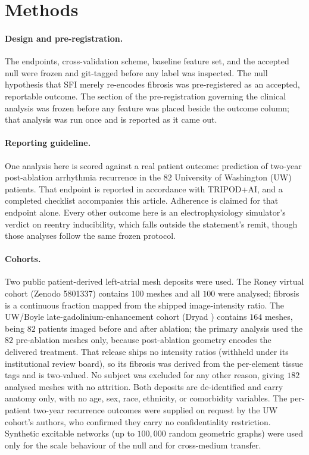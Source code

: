 ﻿\section{Methods}

\paragraph{Design and pre-registration.} The endpoints, cross-validation scheme,
baseline feature set, and the accepted null were frozen and git-tagged before any
label was inspected. The null hypothesis that SFI merely re-encodes fibrosis was
pre-registered as an accepted, reportable outcome. The section of the
pre-registration governing the clinical analysis was frozen before any feature was
placed beside the outcome column; that analysis was run once and is reported as it
came out.

\paragraph{Reporting guideline.} One analysis here is scored against a real
patient outcome: prediction of two-year post-ablation arrhythmia recurrence in
the $82$ University of Washington (UW) patients. That endpoint
is reported in accordance with TRIPOD+AI, and a completed checklist accompanies
this article. Adherence is claimed for that endpoint alone. Every other outcome
here is an electrophysiology simulator's verdict on reentry inducibility, which
falls outside the statement's remit, though those analyses follow the same
frozen protocol.

\paragraph{Cohorts.} Two public patient-derived left-atrial mesh deposits were
used. The Roney virtual cohort (Zenodo 5801337) contains $100$ meshes and all
$100$ were analysed; fibrosis is a continuous fraction mapped from the shipped
image-intensity ratio. The UW/Boyle late-gadolinium-enhancement cohort (Dryad
) contains $164$ meshes, being $82$ patients imaged
before and after ablation; the primary analysis used the $82$ pre-ablation meshes
only, because post-ablation geometry encodes the delivered treatment. That
release ships no intensity ratios (withheld under its institutional review
board), so its fibrosis was derived from the per-element tissue tags and is
two-valued. No subject was excluded for any other reason, giving $182$ analysed
meshes with no attrition. Both deposits are de-identified and carry anatomy only,
with no age, sex, race, ethnicity, or comorbidity variables. The per-patient
two-year recurrence outcomes were supplied on request by the UW cohort's authors,
who confirmed they carry no confidentiality restriction. Synthetic excitable
networks (up to $100{,}000$ random geometric graphs) were used only for the scale
behaviour of the null and for cross-medium transfer.

